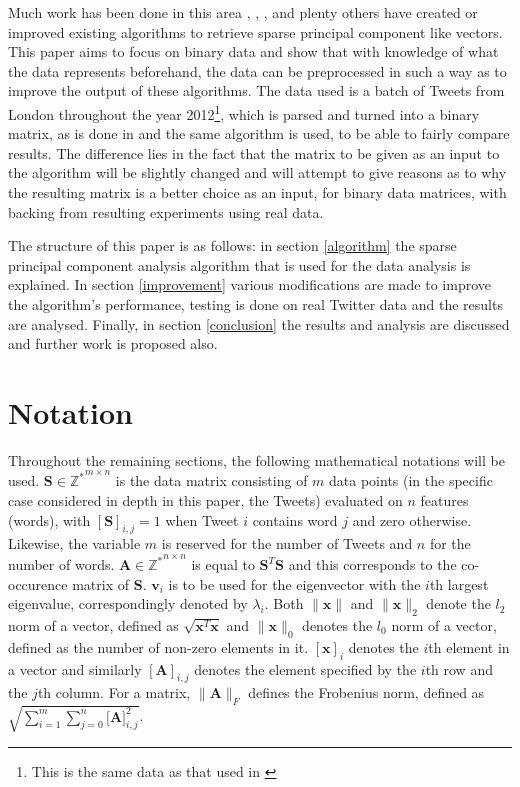 \documentclass[graybox]{svmult}
\begin{document}
Much work has been done in this area \cite{shen}, \cite{daspremont}, \cite{zou}, \cite{truncpower} and plenty others have created or improved existing algorithms to retrieve sparse principal component like vectors. This paper aims to focus on binary data and show that with knowledge of what the data represents beforehand, the data can be preprocessed in such a way as to improve the output of these algorithms. The data used is a batch of Tweets from London throughout the year 2012\footnote{This is the same data as that used in \cite{microblogs}}, which is parsed and turned into a binary matrix, as is done in \cite{dimakis} and the same algorithm is used, to be able to fairly compare results. The difference lies in the fact that the matrix to be given as an input to the algorithm will be slightly changed and will attempt to give reasons as to why the resulting matrix is a better choice as an input, for binary data matrices, with backing from resulting experiments using real data. 

The structure of this paper is as follows: in section \ref{algorithm} the sparse principal component analysis algorithm that is used for the data analysis is explained. In section \ref{improvement} various modifications are made to improve the algorithm's performance, testing is done on real Twitter data and the results are analysed. Finally, in section \ref{conclusion} the results and analysis are discussed and further work is proposed also. 

\section{Notation}

Throughout the remaining sections, the following mathematical notations will be used. $\mathbf{S} \in \mathbb{Z^*}^{m\times n}$ is the data matrix consisting of $m$ data points (in the specific case considered in depth in this paper, the Tweets) evaluated on $n$ features (words), with $[\mathbf{S}]_{i,j} = 1$ when Tweet $i$ contains word $j$ and zero otherwise. Likewise, the variable $m$ is reserved for the number of Tweets and $n$ for the number of words. $\mathbf{A} \in \mathbb{Z^*}^{n \times n}$ is equal to $\mathbf{S}^T\mathbf{S}$ and this corresponds to the co-occurence matrix of $\mathbf{S}$. $\mathbf{v}_i$ is to be used for the eigenvector with the $i$th largest eigenvalue, correspondingly denoted by $\lambda_i$. Both $\|\mathbf{x}\|$ and $\|\mathbf{x}\|_2$ denote the $l_2$ norm of a vector, defined as $\sqrt{\mathbf{x}^T\mathbf{x}}$ and $\|\mathbf{x}\|_0$ denotes the $l_0$ norm of a vector, defined as the number of non-zero elements in it. $[\mathbf{x} ]_i$ denotes the $i$th element in a vector and similarly $[\mathbf{A}]_{i, j}$ denotes the element specified by the $i$th row and the $j$th column. For a matrix, $\|\mathbf{A}\|_F$ defines the Frobenius norm, defined as $\sqrt{\sum^m_{i=1}{\sum_{j=0}^n{\mathbf{[A}]_{i, j}^2}}}$.
\end{document}
